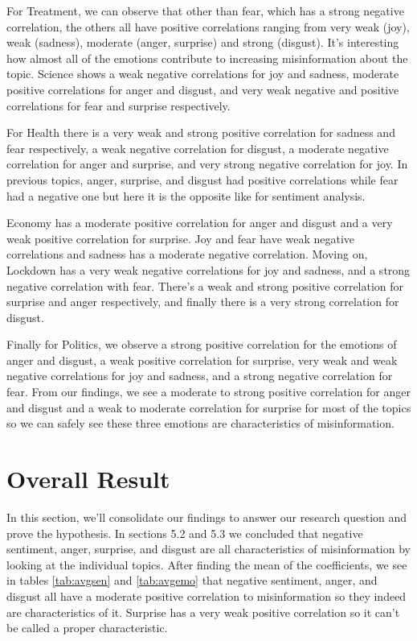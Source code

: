 \documentclass{l4proj}
\begin{document}
For Treatment, we can observe that other than fear, which has a strong negative correlation, the others all have positive correlations ranging from very weak (joy), weak (sadness), moderate (anger, surprise) and strong (disgust). It's interesting how almost all of the emotions contribute to increasing misinformation about the topic. Science shows a weak negative correlations for joy and sadness, moderate positive correlations for anger and disgust, and very weak negative and positive correlations for fear and surprise respectively.

For Health there is a very weak and strong positive correlation for sadness and fear respectively, a weak negative correlation for disgust, a moderate negative correlation for anger and surprise, and very strong negative correlation for joy. In previous topics, anger, surprise, and disgust had positive correlations while fear had a negative one but here it is the opposite like for sentiment analysis.

Economy has a moderate positive correlation for anger and disgust and a very weak positive correlation for surprise. Joy and fear have weak negative correlations and sadness has a moderate negative correlation. Moving on, Lockdown has a very weak negative correlations for joy and sadness, and a strong negative correlation with fear. There's a weak and strong positive correlation for surprise and anger respectively, and finally there is a very strong correlation for disgust.

Finally for Politics, we observe a strong positive correlation for the emotions of anger and disgust, a weak positive correlation for surprise, very weak and weak negative correlations for joy and sadness, and a strong negative correlation for fear. From our findings, we see a moderate to strong positive correlation for anger and disgust and a weak to moderate correlation for surprise for most of the topics so we can safely see these three emotions are characteristics of misinformation.


\section{Overall Result}
In this section, we'll consolidate our findings to answer our research question and prove the hypothesis. In sections 5.2 and 5.3 we concluded that negative sentiment, anger, surprise, and disgust are all characteristics of misinformation by looking at the individual topics. After finding the mean of the coefficients, we see in tables \ref{tab:avgsen} and \ref{tab:avgemo} that negative sentiment, anger, and disgust all have a moderate positive correlation to misinformation so they indeed are characteristics of it. Surprise has a very weak positive correlation so it can't be called a proper characteristic. 
\end{document}
